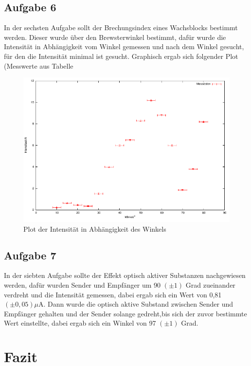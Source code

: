 \documentclass[12pt]{scrartcl}
\begin{document}
\subsection{Aufgabe 6}
In der sechsten Aufgabe sollt der Brechungsindex eines Wachsblocks bestimmt werden. Dieser wurde über den Brewsterwinkel bestimmt, dafür wurde die Intensität in Abhängigkeit vom Winkel gemessen und nach dem Winkel gesucht, für den die Intensität minimal ist gesucht. Graphisch ergab sich folgender Plot (Messwerte aus Tabelle %

\begin{figure}[H]
\centering
    \includegraphics[scale = 1]{a_6.pdf}
  	\caption[Plot der Intensität in Abhängigkeit des Winkels]{Plot der Intensität in Abhängigkeit des Winkels}
  \label{fig:a_6}
\end{figure}

\subsection{Aufgabe 7}
In der siebten Aufgabe sollte der Effekt optisch aktiver Substanzen nachgewiesen werden, dafür wurden Sender und Empfänger um 90 $(\pm 1)$ Grad zueinander verdreht und die Intensität gemessen, dabei ergab sich ein Wert von 0,81 $(\pm 0,05) \mu$A.  Dann wurde die optisch aktive Substand zwischen Sender und Empfänger gehalten und der Sender solange gedreht,bis sich der zuvor bestimmte Wert einstellte, dabei ergab sich ein Winkel von 97 $(\pm 1)$ Grad.

\section{Fazit}

\end{document}
